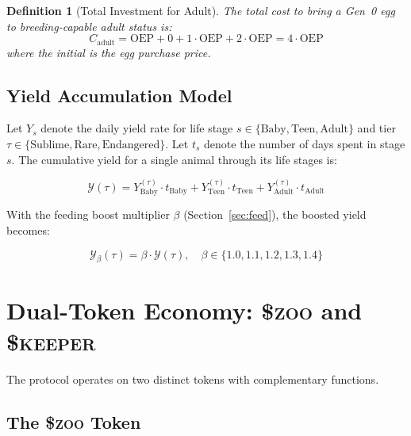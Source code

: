 \documentclass[11pt,letterpaper]{article}
\newtheorem{definition}{Definition}[section]
\newcommand{\ZOO}{\$\textsc{zoo}}
\newcommand{\KEEPER}{\$\textsc{keeper}}
\newcommand{\OEP}{\text{OEP}}
\begin{document}
\begin{definition}[Total Investment for Adult]
The total cost to bring a Gen~0 egg to breeding-capable adult status is:
\begin{equation}
C_{\text{adult}} = \OEP + 0 + 1 \cdot \OEP + 2 \cdot \OEP = 4 \cdot \OEP
\label{eq:adult-cost}
\end{equation}
where the initial \OEP{} is the egg purchase price.
\end{definition}

\subsection{Yield Accumulation Model}

Let $Y_s$ denote the daily yield rate for life stage $s \in \{\text{Baby}, \text{Teen}, \text{Adult}\}$ and tier $\tau \in \{\text{Sublime}, \text{Rare}, \text{Endangered}\}$.  Let $t_s$ denote the number of days spent in stage $s$.  The cumulative yield for a single animal through its life stages is:

\begin{equation}
\mathcal{Y}(\tau) = Y_{\text{Baby}}^{(\tau)} \cdot t_{\text{Baby}} + Y_{\text{Teen}}^{(\tau)} \cdot t_{\text{Teen}} + Y_{\text{Adult}}^{(\tau)} \cdot t_{\text{Adult}}
\label{eq:yield-cumulative}
\end{equation}

With the feeding boost multiplier $\beta$ (Section~\ref{sec:feed}), the boosted yield becomes:

\begin{equation}
\mathcal{Y}_{\beta}(\tau) = \beta \cdot \mathcal{Y}(\tau), \quad \beta \in \{1.0, 1.1, 1.2, 1.3, 1.4\}
\label{eq:yield-boosted}
\end{equation}

\section{Dual-Token Economy: \ZOO{} and \KEEPER{}}
\label{sec:dual-token}

The protocol operates on two distinct tokens with complementary functions.

\subsection{The \ZOO{} Token}
\end{document}
